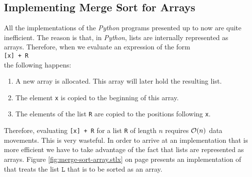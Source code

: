 \subsection{Implementing Merge Sort for Arrays}
All the implementations of the \textsl{Python} programs presented up to now are quite inefficient.  The
reason is that, in \textsl{Python}, lists are internally represented as arrays.  Therefore, when
we evaluate an expression of the form 
\\[0.2cm]
\hspace*{1.3cm}
\texttt{[x] + R}
\\[0.2cm]
the following happens:
\begin{enumerate}
\item A new array is allocated.  This array will later hold the resulting list.
\item The element \texttt{x} is copied to the beginning of this array.
\item The elements of the list \texttt{R} are copied to the positions following \texttt{x}.
\end{enumerate}
Therefore, evaluating \texttt{[x] + R} for a list \texttt{R} of length $n$ requires $\mathcal{O}(n)$ data
movements.  This is very wasteful.  In order to arrive at an
implementation that is more efficient we have to take advantage of the fact that lists are represented as arrays.
Figure \ref{fig:merge-sort-array.stlx} on page \pageref{fig:merge-sort-array.stlx} presents
an implementation of  that treats the list $\texttt{L}$ that is to be sorted as an array.


